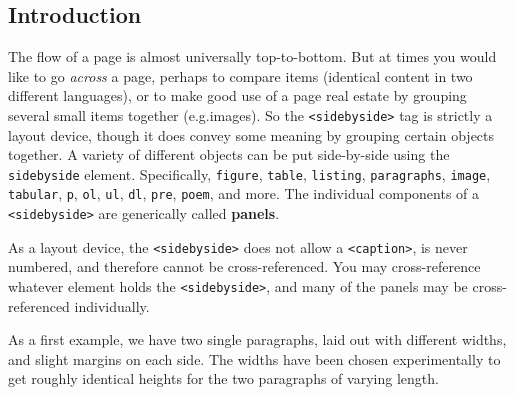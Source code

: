\documentclass[10pt,]{article}
\newcommand{\terminology}[1]{\textbf{#1}}
\theoremstyle{plain}
\theoremstyle{definition}
\theoremstyle{definition}
\theoremstyle{definition}
\theoremstyle{definition}
\theoremstyle{definition}
\theoremstyle{definition}
\numberwithin{equation}{section}
\begin{document}
\subsection*{Introduction}
\hypertarget{p-645}{}%
The flow of a page is almost universally top-to-bottom.  But at times you would like to go \emph{across} a page, perhaps to compare items (identical content in two different languages), or to make good use of a page real estate by grouping several small items together (e.g.\@ images).  So the \lstinline?<sidebyside>? tag is strictly a layout device, though it does convey some meaning by grouping certain objects together. A variety of different objects can be put side-by-side using the \lstinline?sidebyside? element.  Specifically, \lstinline?figure?, \lstinline?table?, \lstinline?listing?, \lstinline?paragraphs?, \lstinline?image?, \lstinline?tabular?, \lstinline?p?, \lstinline?ol?, \lstinline?ul?, \lstinline?dl?, \lstinline?pre?, \lstinline?poem?, and more.  The individual components of a \lstinline?<sidebyside>? are generically called \terminology{panels}.%
\par
\hypertarget{p-646}{}%
As a layout device, the \lstinline?<sidebyside>? does not allow a \lstinline?<caption>?, is never numbered, and therefore cannot be cross-referenced.  You may cross-reference whatever element holds the \lstinline?<sidebyside>?, and many of the panels may be cross-referenced individually.%
\par
\hypertarget{p-647}{}%
As a first example, we have two single paragraphs, laid out with different widths, and slight margins on each side.  The widths have been chosen experimentally to get roughly identical heights for the two paragraphs of varying length.%
\end{document}
